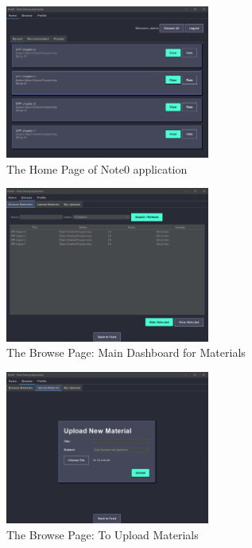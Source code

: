 \documentclass[12pt, a4paper]{report}
\begin{document}
\begin{figure}[h!]
    \centering
    \includegraphics[width=0.6\textwidth]{new_images_note/home_page.png}
    \caption{The Home Page of Note0 application}
    \label{fig:home_page}
\end{figure}

\begin{figure}[h!]
    \centering
    \includegraphics[width=0.6\textwidth]{new_images_note/browse_page.png}
    \caption{The Browse Page: Main Dashboard for Materials}
    \label{fig:browse_page}
\end{figure}

\begin{figure}[h!]
    \centering
    \includegraphics[width=0.6\textwidth]{new_images_note/browse_upload.png}
    \caption{The Browse Page: To Upload Materials}
    \label{fig:browse_upload}
\end{figure}
\end{document}
